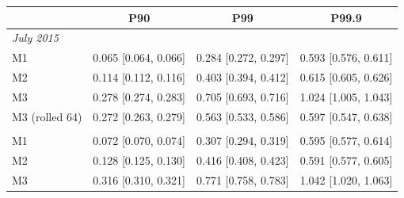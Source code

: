 \begin{tabular}{lccc}
\toprule
 & P90 & P99 & P99.9 \\
\midrule
\multicolumn{4}{l}{\emph{July 2015}} \\
M1 & 0.065 [0.064, 0.066] & 0.284 [0.272, 0.297] & 0.593 [0.576, 0.611] \\
M2 & 0.114 [0.112, 0.116] & 0.403 [0.394, 0.412] & 0.615 [0.605, 0.626] \\
M3 & 0.278 [0.274, 0.283] & 0.705 [0.693, 0.716] & 1.024 [1.005, 1.043] \\
M3 (rolled 64) & 0.272 [0.263, 0.279] & 0.563 [0.533, 0.586] & 0.597 [0.547, 0.638] \\
\addlinespace\multicolumn{4}{l}{\emph{January 2015}} \\
M1 & 0.072 [0.070, 0.074] & 0.307 [0.294, 0.319] & 0.595 [0.577, 0.614] \\
M2 & 0.128 [0.125, 0.130] & 0.416 [0.408, 0.423] & 0.591 [0.577, 0.605] \\
M3 & 0.316 [0.310, 0.321] & 0.771 [0.758, 0.783] & 1.042 [1.020, 1.063] \\
\bottomrule
\end{tabular}
